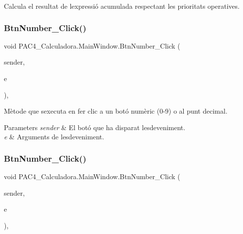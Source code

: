 Calcula el resultat de l\textquotesingle{}expressió acumulada respectant les prioritats operatives. 

\mbox{\label{class_p_a_c4___calculadora_1_1_main_window_ab4d09576c518172d01427afd0e967127}} 
\subsubsection{\texorpdfstring{Btn\+Number\+\_\+\+Click()}{BtnNumber\_Click()}\hspace{0.1cm}{\footnotesize\ttfamily [1/2]}}
{\footnotesize\ttfamily void P\+A\+C4\+\_\+\+Calculadora.\+Main\+Window.\+Btn\+Number\+\_\+\+Click (\begin{DoxyParamCaption}\item[{object}]{sender,  }\item[{Routed\+Event\+Args}]{e }\end{DoxyParamCaption})\hspace{0.3cm}{\ttfamily [inline]}, {\ttfamily [private]}}



Mètode que s\textquotesingle{}executa en fer clic a un botó numèric (0-\/9) o al punt decimal. 


\begin{DoxyParams}{Parameters}
{\em sender} & El botó que ha disparat l\textquotesingle{}esdeveniment.\\
\hline
{\em e} & Arguments de l\textquotesingle{}esdeveniment.\\
\hline
\end{DoxyParams}
\mbox{\label{class_p_a_c4___calculadora_1_1_main_window_ab4d09576c518172d01427afd0e967127}} 
\subsubsection{\texorpdfstring{Btn\+Number\+\_\+\+Click()}{BtnNumber\_Click()}\hspace{0.1cm}{\footnotesize\ttfamily [2/2]}}
{\footnotesize\ttfamily void P\+A\+C4\+\_\+\+Calculadora.\+Main\+Window.\+Btn\+Number\+\_\+\+Click (\begin{DoxyParamCaption}\item[{object}]{sender,  }\item[{Routed\+Event\+Args}]{e }\end{DoxyParamCaption})\hspace{0.3cm}{\ttfamily [inline]}, {\ttfamily [private]}}



